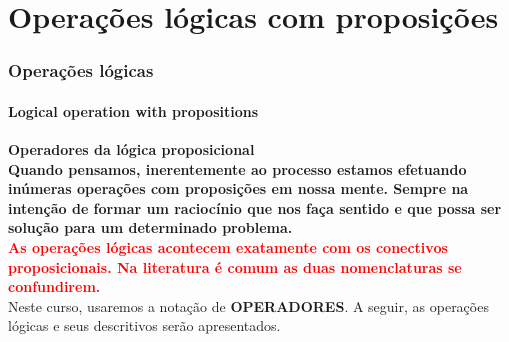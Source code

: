 \documentclass[10pt, headsepline, captions=tableabove, xcolor=table]{beamer}
\begin{document}
\section{Operações lógicas com proposições}
%
\begin{frame}[c]
    \frametitle{Operações lógicas}
    \framesubtitle{Logical operation with propositions}
    \textbf{Operadores da lógica proposicional}\\[2pt]
    \textcolor{green!50!black}{\textbf{Quando pensamos, inerentemente ao processo estamos efetuando inúmeras operações com proposições em nossa mente. Sempre na intenção de formar um raciocínio que nos faça sentido e que possa ser solução para um determinado problema.}}\\[6pt]

    \textcolor{red}{\textbf{As operações lógicas acontecem exatamente com os conectivos proposicionais. Na literatura é comum as duas nomenclaturas se confundirem.}}\\[6pt]
    
    Neste curso, usaremos a notação de \textbf{OPERADORES}. A seguir, as operações lógicas e seus descritivos serão apresentados.

\end{frame}
%
\end{document}
